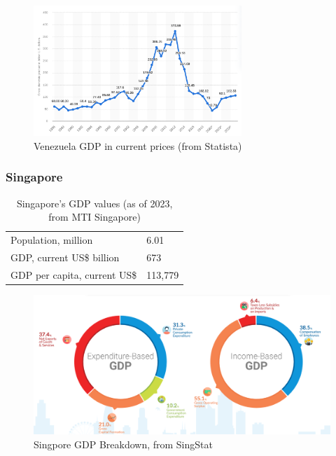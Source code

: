 \documentclass[12pt]{article}
\begin{document}
\begin{figure}[H]
    \centering
    \includegraphics[width=0.7\textwidth]{Images/venezuelagdp.png}
    \caption{Venezuela GDP in current prices (from Statista)}
    \label{fig:5-vengdp}
\end{figure} 

\subsubsection*{Singapore}

\begin{table}[H]
    \centering
    \begin{tabular}{l l} \hline
        Population, million & 6.01 \\ 
        GDP, current US\$ billion & 673 \\ 
        GDP per capita, current US\$ & 113,779 \\ \hline 
    \end{tabular}
    \caption{Singapore's GDP values (as of 2023, from MTI Singapore)}
    \label{5-sggdp}
\end{table}

\begin{figure}[H]
    \centering
    \includegraphics[width=\textwidth]{Images/singaporegdp.png}
    \caption{Singpore GDP Breakdown, from SingStat}
    \label{fig:5-sggdp}
\end{figure} 
\end{document}
